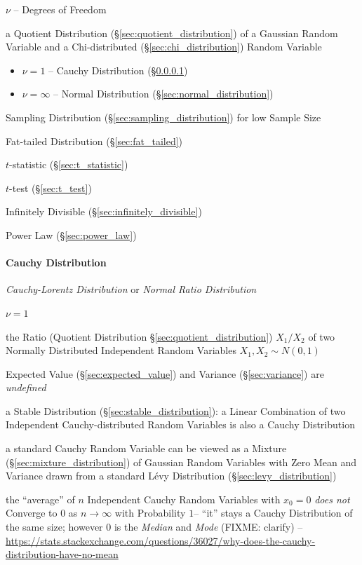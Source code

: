 $\nu$ -- Degrees of Freedom

a Quotient Distribution (\S\ref{sec:quotient_distribution}) of a Gaussian Random
Variable and a Chi-distributed (\S\ref{sec:chi_distribution}) Random Variable

\begin{itemize}
  \item $\nu = 1$ -- Cauchy Distribution (\S\ref{sec:cauchy_distribution})
  \item $\nu = \infty$ -- Normal Distribution (\S\ref{sec:normal_distribution})
\end{itemize}

Sampling Distribution (\S\ref{sec:sampling_distribution}) for low Sample Size

Fat-tailed Distribution (\S\ref{sec:fat_tailed})

$t$-statistic (\S\ref{sec:t_statistic})

$t$-test (\S\ref{sec:t_test})

Infinitely Divisible (\S\ref{sec:infinitely_divisible})

Power Law (\S\ref{sec:power_law})



\paragraph{Cauchy Distribution}\label{sec:cauchy_distribution}\hfill

\emph{Cauchy-Lorentz Distribution} or \emph{Normal Ratio Distribution}

$\nu = 1$

the Ratio (Quotient Distribution \S\ref{sec:quotient_distribution}) $X_1/X_2$ of
two Normally Distributed Independent Random Variables $X_1, X_2 \sim N(0,1)$

Expected Value (\S\ref{sec:expected_value}) and Variance (\S\ref{sec:variance})
are \emph{undefined}

a Stable Distribution (\S\ref{sec:stable_distribution}): a Linear Combination of
two Independent Cauchy-distributed Random Variables is also a Cauchy
Distribution

a standard Cauchy Random Variable can be viewed as a Mixture
(\S\ref{sec:mixture_distribution}) of Gaussian Random Variables with Zero Mean
and Variance drawn from a standard L\'evy Distribution
(\S\ref{sec:levy_distribution})

the ``average'' of $n$ Independent Cauchy Random Variables with $x_0 = 0$
\emph{does not} Converge to $0$ as $n \to \infty$ with Probability $1$-- ``it''
stays a Cauchy Distribution of the same size; however $0$ is the \emph{Median}
and \emph{Mode} (FIXME: clarify)
--\url{https://stats.stackexchange.com/questions/36027/why-does-the-cauchy-distribution-have-no-mean}

